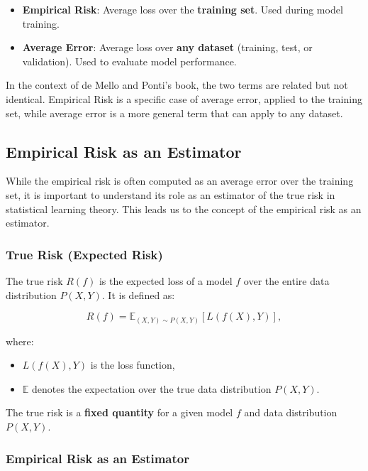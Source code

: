 \begin{notechapter}
\begin{itemize}
    \item \textbf{Empirical Risk}: Average loss over the \textbf{training set}. Used during model training.
    \item \textbf{Average Error}: Average loss over \textbf{any dataset} (training, test, or validation). Used to evaluate model performance.
\end{itemize}

In the context of de Mello and Ponti's book, the two terms are related but not identical. Empirical Risk is a specific case of average error, applied to the training set, while average error is a more general term that can apply to any dataset.

\subsection{Empirical Risk as an Estimator}

While the empirical risk is often computed as an average error over the training set, it is important to understand its role as an estimator of the true risk in statistical learning theory. This leads us to the concept of the empirical risk as an estimator.

\subsubsection{True Risk (Expected Risk)}

The true risk \( R(f) \) is the expected loss of a model \( f \) over the entire data distribution \( P(X, Y) \). It is defined as:

\[
R(f) = \mathbb{E}_{(X,Y) \sim P(X,Y)}[L(f(X), Y)],
\]

where:
\begin{itemize}
    \item \( L(f(X), Y) \) is the loss function,
    \item \( \mathbb{E} \) denotes the expectation over the true data distribution \( P(X, Y) \).
\end{itemize}

The true risk is a \textbf{fixed quantity} for a given model \( f \) and data distribution \( P(X, Y) \).

\subsubsection{Empirical Risk as an Estimator}


\end{notechapter}
